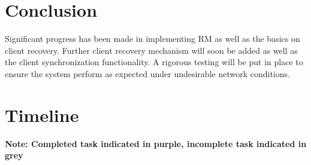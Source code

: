 \documentclass[12pt]{article}
\begin{document}

\pagebreak




\pagebreak

\tableofcontents
\pagebreak


\pagebreak


















\section{Conclusion}
Significant progress has been made in implementing RM as well as the basics on client recovery. Further client recovery mechanism will soon be added as well as the client synchronization functionality. A rigorous testing will be put in place to ensure the system perform as expected under undesirable network conditions. 

\pagebreak
\section{Timeline}\label{Timeline}

\textbf{Note: Completed task indicated in purple, incomplete task indicated in grey}
\end{document}
